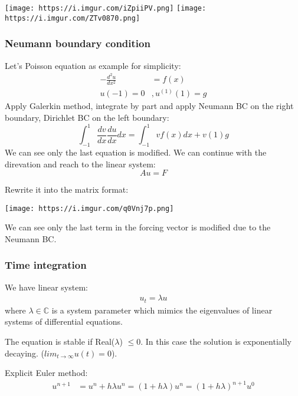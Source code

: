 \documentclass[
]{scrartcl}
\begin{document}
\texttt{[image: https://i.imgur.com/iZpiiPV.png]}
\texttt{[image: https://i.imgur.com/ZTv0870.png]}

\hypertarget{neumann-boundary-condition}{%
\subsubsection{Neumann boundary
condition}\label{neumann-boundary-condition}}

Let's Poisson equation as example for simplicity: \begin{align}
-\frac{d^2u}{dx^2} &= f(x)\\
u(-1) = 0&,u^{(1)}(1)=g
\end{align} Apply Galerkin method, integrate by part and apply Neumann
BC on the right boundary, Dirichlet BC on the left boundary:
\begin{equation}
\int_{-1}^1\frac{dv}{dx}\frac{du}{dx}dx = \int_{-1}^1 vf(x)dx+v(1)g
\end{equation} We can see only the last equation is modified. We can
continue with the direvation and reach to the linear system:
\begin{equation}
Au=F
\end{equation}

Rewrite it into the matrix format:

\texttt{[image: https://i.imgur.com/q0Vnj7p.png]}

We can see only the last term in the forcing vector is modified due to
the Neumann BC.

\hypertarget{time-integration}{%
\subsubsection{Time integration}\label{time-integration}}

We have linear system: \begin{align}
u_t = \lambda u
\end{align} where \(\lambda\in\mathbb{C}\) is a system parameter which
mimics the eigenvalues of linear systems of differential equations.

The equation is stable if Real(\(\lambda\)) \(\leq 0\). In this case the
solution is exponentially decaying. (\(lim_{t\to\infty}u(t) = 0\)).

Explicit Euler method: \begin{align}
u^{n+1} &= u^{n} + h\lambda u^{n}
=(1+h\lambda)u^{n}
=(1+h\lambda)^{n+1}u^0
\end{align}
\end{document}

